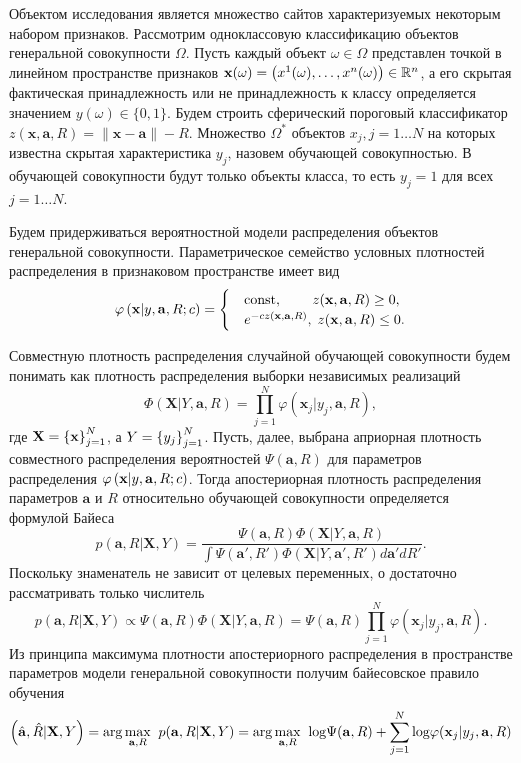 Объектом исследования является множество сайтов характеризуемых некоторым набором признаков.
Рассмотрим одноклассовую классификацию объектов генеральной совокупности $\Omega$.
Пусть каждый объект $\omega \in{\Omega}$  представлен точкой в линейном пространстве признаков
$\mathbf{x}(\omega)=\left(x^1(\omega),\ldots, x^n(\omega)\right) \in {\mathbb{R}^n}$,
а его скрытая фактическая принадлежность или не принадлежность к классу
определяется значением $y(\omega)\in{\{0,1\}}$. Будем строить сферический пороговый классификатор
$z(\mathbf{x},\mathbf{a},R)=\left\|\mathbf{x}-\mathbf{a}\right\|-R$. Множество $\Omega^*$ объектов 
$x_j, j=1 \ldots N$ на которых известна скрытая характеристика $y_j$, назовем обучающей совокупностью. 
В обучающей совокупности будут только объекты класса, то есть $y_j=1$ для всех $j=1\ldots N$.


Будем придерживаться вероятностной модели распределения объектов генеральной совокупности. 
Параметрическое семейство условных плотностей распределения в признаковом пространстве имеет вид 
\begin{equation}
\label{prob1}
	\varphi \cbr{ {\mathbf x | y,\mathbf{a},R;c} } =
	\begcas{
		&\text{const},		\qquad\,					z(\mathbf{x},\mathbf{a},R) \geq 0, \\
		&e^{-c z(\mathbf{x},\mathbf{a},R)},\;	z(\mathbf{x},\mathbf{a},R) \leq 0.
	} 
\vspace{-5pt}
\end{equation}


Совместную плотность распределения случайной обучающей совокупности будем понимать как плотность 
распределения выборки независимых реализаций
$$\Phi(\mathbf{X}|Y,\mathbf{a},R)=\prod \limits_{j=1}^N \varphi(\mathbf{x}_j|y_j,\mathbf{a},R),$$ 
где $\mathbf{X}= \left\{\mathbf{x}\right\}_{j=1}^N$, а $Y = \left\{y_j\right\}_{j=1}^N$.
Пусть, далее, выбрана априорная плотность совместного распределения вероятностей $\Psi(\mathbf{a},R)$ 
для параметров распределения $\varphi \left(\mathbf x | y,\mathbf{a},R;c\right)$. Тогда апостериорная
 плотность распределения параметров $\mathbf{a}$ и $R$ относительно обучающей совокупности определяется 
формулой Байеса
$$p(\mathbf{a},R|\mathbf{X},Y)=\frac{\Psi(\mathbf{a},R) \Phi(\mathbf{X}|Y,\mathbf{a},R)}
{\int {\Psi(\mathbf{a}',R') \Phi(\mathbf{X}|Y,\mathbf{a}',R')d\mathbf{a}'dR'}}.$$
Поскольку знаменатель не зависит от целевых переменных, о достаточно рассматривать только числитель
$$p(\mathbf{a},R|\mathbf{X},Y) \propto \Psi(\mathbf{a},R) \Phi(\mathbf{X}|Y,\mathbf{a},R) = 
\Psi(\mathbf{a},R) \prod \limits_{j=1}^N \varphi(\mathbf{x}_j|y_j,\mathbf{a},R).$$
Из принципа максимума плотности апостериорного распределения в пространстве параметров модели генеральной
 совокупности получим байесовское правило обучения
$$\left(\hat{\mathbf{a}},\hat{R}|\mathbf{X},Y\right)
	= \arg\underset{\mathbf{a},R}{\max}\;\; p(\mathbf{a},R|\mathbf{X},Y) 
	= \arg\underset{\mathbf{a},R}{\max}\;\; {\log}\Psi(\mathbf{a},R) + \sum\limits_{j=1}^N{\log}\varphi(\mathbf{x}_j|y_j,\mathbf{a},R) $$


